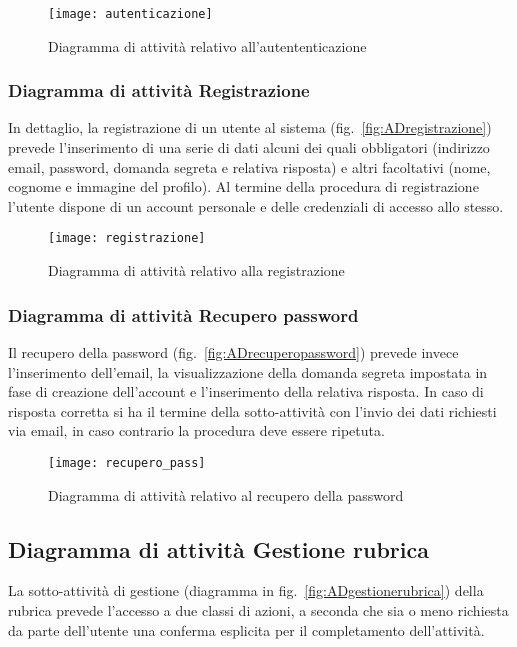 \begin{figure}[H]
\centering
\texttt{[image: autenticazione]}
\caption{Diagramma di attività relativo all'autententicazione}\label{fig:ADautenticazione}
\end{figure}

\subsubsection{Diagramma di attività Registrazione}
In dettaglio, la registrazione di un utente al sistema (fig.~\vref{fig:ADregistrazione}) prevede l'inserimento di una serie di dati alcuni dei quali obbligatori (indirizzo email, password, domanda segreta e relativa risposta) e altri facoltativi (nome, cognome e immagine del profilo). Al termine della procedura di registrazione l'utente dispone di un account personale e delle credenziali di accesso allo stesso.

\begin{figure}[H]
\centering
\texttt{[image: registrazione]}
\caption{Diagramma di attività relativo alla registrazione}\label{fig:ADregistrazione}
\end{figure}

\subsubsection{Diagramma di attività Recupero password}
Il recupero della password (fig.~\vref{fig:ADrecuperopassword}) prevede invece l'inserimento dell'email, la visualizzazione della domanda segreta impostata in fase di creazione dell'account e l'inserimento della relativa risposta. In caso di risposta corretta si ha il termine della sotto-attività con l'invio dei dati richiesti via email, in caso contrario la procedura deve essere ripetuta.

\begin{figure}[H]
\centering
\texttt{[image: recupero\_pass]}
\caption{Diagramma di attività relativo al recupero della password}\label{fig:ADrecuperopassword}
\end{figure}

\subsection{Diagramma di attività Gestione rubrica}
La sotto-attività di gestione (diagramma in fig.~\vref{fig:ADgestionerubrica}) della rubrica prevede l'accesso a due classi di azioni, a seconda che sia o meno richiesta da parte dell'utente una conferma esplicita per il completamento dell'attività.

